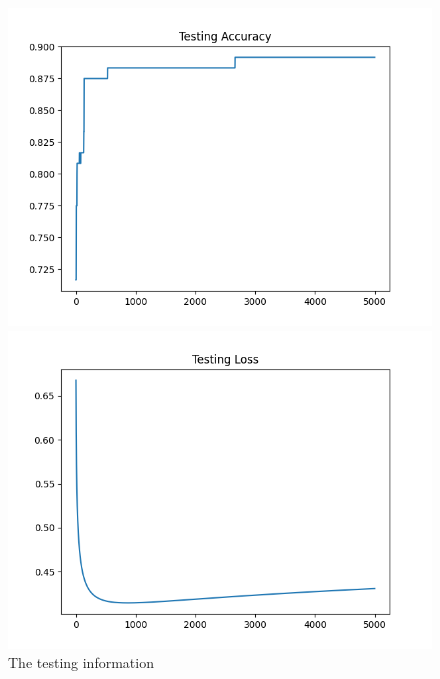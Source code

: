 \begin{figure}[htbp]
  \centerline{\includegraphics[width=\textwidth]{../image/testing_acc.png}}
  \centerline{\includegraphics[width=\textwidth]{../image/testing_loss.png}}
  \caption{The testing information}
  \label{fig:testing}
\end{figure}